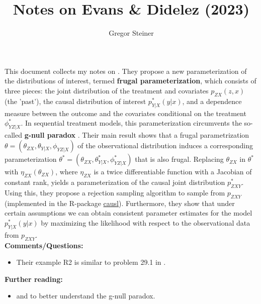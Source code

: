 \documentclass[10pt]{article}
\author{Gregor Steiner}
\title{Notes on Evans \& Didelez (2023)}
\begin{document}
\maketitle

This document collects my notes on \cite{evans_didelez_2023}. They propose a new parameterization of the distributions of interest, termed \textbf{frugal parameterization}, which consists of three pieces: the joint distribution of the treatment and covariates $p_{ZX}(z, x)$ (the 'past'), the causal distribution of interest $p_{Y | X}^* (y|x)$, and a dependence measure between the outcome and the covariates conditional on the treatment $\phi_{YZ | X}^*$. In sequential treatment models, this parameterization circumvents the so-called \textbf{g-null paradox} \citep{robins_wasserman_1997}. Their main result shows that a frugal parametrization $\theta = (\theta_{ZX}, \theta_{Y|X}, \phi_{YZ | X})$ of the observational distribution induces a corresponding parameterization  $\theta^* = (\theta_{ZX}, \theta_{Y|X}^*, \phi_{YZ | X}^*)$ that is also frugal. Replacing $\theta_{ZX}$ in $\theta^*$ with $\eta_{ZX}(\theta_{ZX})$, where $\eta_{ZX}$ is a twice differentiable function with a Jacobian of constant rank, yields a parameterization of the causal joint distribution $p_{ZXY}^*$. Using this, they propose a rejection sampling algorithm to sample from $p_{ZXY}$ (implemented in the R-package \href{https://github.com/rje42/causl}{causl}). Furthermore, they show that under certain assumptions we can obtain consistent parameter estimates for the model $p_{Y | X}^* (y|x)$ by maximizing the likelihood with respect to the observational data from $p_{ZXY}$. \\

\textbf{Comments/Questions:}
\begin{itemize}
	\item Their example R2 is similar to problem 29.1 in \cite{ding2023course}.
\end{itemize}

\textbf{Further reading:} 
\begin{itemize}
	\item \cite{robins_wasserman_1997} and \cite{mcgrath2022revisiting} to better understand the g-null paradox.
\end{itemize}










\end{document}
